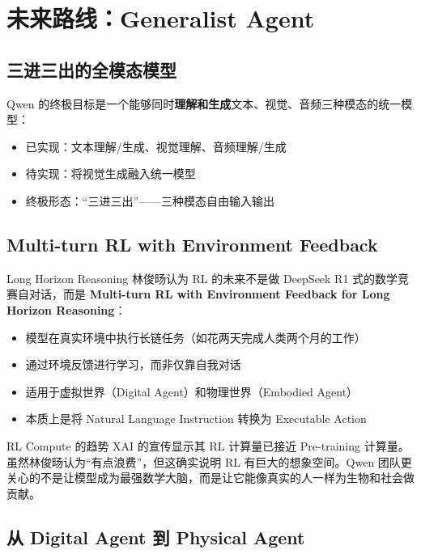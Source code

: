 \section{未来路线：Generalist Agent}

\subsection{三进三出的全模态模型}

Qwen 的终极目标是一个能够同时\textbf{理解和生成}文本、视觉、音频三种模态的统一模型：

\begin{itemize}
    \item 已实现：文本理解/生成、视觉理解、音频理解/生成
    \item 待实现：将视觉生成融入统一模型
    \item 终极形态：``三进三出''——三种模态自由输入输出
\end{itemize}

\subsection{Multi-turn RL with Environment Feedback}

\begin{importantbox}{Long Horizon Reasoning}
林俊旸认为 RL 的未来不是做 DeepSeek R1 式的数学竞赛自对话，而是 \textbf{Multi-turn RL with Environment Feedback for Long Horizon Reasoning}：
\begin{itemize}
    \item 模型在真实环境中执行长链任务（如花两天完成人类两个月的工作）
    \item 通过环境反馈进行学习，而非仅靠自我对话
    \item 适用于虚拟世界（Digital Agent）和物理世界（Embodied Agent）
    \item 本质上是将 Natural Language Instruction 转换为 Executable Action
\end{itemize}
\end{importantbox}

\begin{knowledgebox}{RL Compute 的趋势}
XAI 的宣传显示其 RL 计算量已接近 Pre-training 计算量。虽然林俊旸认为``有点浪费''，但这确实说明 RL 有巨大的想象空间。Qwen 团队更关心的不是让模型成为最强数学大脑，而是让它能像真实的人一样为生物和社会做贡献。
\end{knowledgebox}

\subsection{从 Digital Agent 到 Physical Agent}

